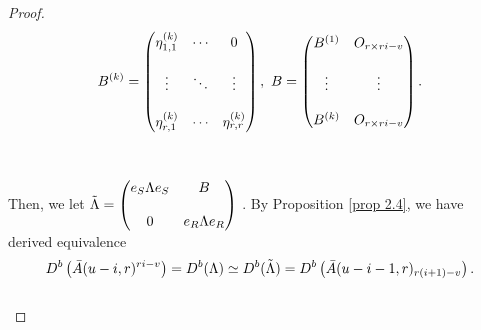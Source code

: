 \documentclass[a4paper, reqno]{amsart}
\theoremstyle{definition}
\theoremstyle{remark}
\numberwithin{equation}{section}
\begin{document}
\begin{proof}
$$
     B^{(k)}   = 
     \left( \begin{matrix}
     \eta_{1,1}^{(k)}  & \cdots & 0      \cr\cr
        \vdots  & \ddots & \vdots      \cr\cr
    \eta_{r,1}^{(k)}  & \cdots & \eta_{r,r}^{(k)}     
\end{matrix}\right),\,\,
       B   =  \left( \begin{matrix}
          B^{(1)} & O_{r \times ri-v}  \cr\cr
        \vdots     &  \vdots       \cr\cr
         B^{(k)}  & O_{r \times ri-v}
    \end{matrix}\right).
 $$\\\\
 Then, we let $\Tilde{\Lambda} =  \left( \begin{matrix}
     e_S \Lambda e_S  & B      \cr\cr
     0  & e_R \Lambda e_R      
\end{matrix}\right) $ . By Proposition \ref{prop 2.4}, we have derived equivalence\\

$$
  D^{b}\left(\Bar{A}(u-i,r)^{ri-v}\right)=D^{b}(\Lambda) \simeq D^{b}(\Tilde{\Lambda}) = D^{b}\left(\Bar{A}(u-i-1,r)_{r(i+1)-v}\right).
  $$\\


\end{proof}
\end{document}

